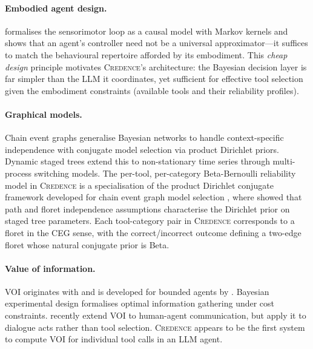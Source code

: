 \documentclass[11pt]{article}
\newcommand{\credence}{\textsc{Credence}}
\begin{document}
\paragraph{Embodied agent design.} \citet{ay2015geometric} formalises the sensorimotor loop as a causal model with Markov kernels and shows that an agent's controller need not be a universal approximator---it suffices to match the behavioural repertoire afforded by its embodiment. This \emph{cheap design} principle \citep{pfeifer2006body, montufar2015cheap} motivates \credence{}'s architecture: the Bayesian decision layer is far simpler than the LLM it coordinates, yet sufficient for effective tool selection given the embodiment constraints (available tools and their reliability profiles).

\paragraph{Graphical models.} Chain event graphs \citep{smith2008chain, freeman2011bayesian, thwaites2009keod} generalise Bayesian networks to handle context-specific independence with conjugate model selection via product Dirichlet priors. Dynamic staged trees \citep{freeman2011dynamic} extend this to non-stationary time series through multi-process switching models. The per-tool, per-category Beta-Bernoulli reliability model in \credence{} is a specialisation of the product Dirichlet conjugate framework developed for chain event graph model selection \citep{freeman2011bayesian}, where \citet[Theorem~18]{freeman2011bayesian} showed that path and floret independence assumptions characterise the Dirichlet prior on staged tree parameters. Each tool-category pair in \credence{} corresponds to a floret in the CEG sense, with the correct/incorrect outcome defining a two-edge floret whose natural conjugate prior is Beta.

\paragraph{Value of information.} VOI originates with \citet{howard1966information} and is developed for bounded agents by \citet{russell1991principles}. Bayesian experimental design \citep{chaloner1995bayesian} formalises optimal information gathering under cost constraints. \citet{dong2026voi} recently extend VOI to human-agent communication, but apply it to dialogue acts rather than tool selection. \credence{} appears to be the first system to compute VOI for individual tool calls in an LLM agent.
\end{document}
